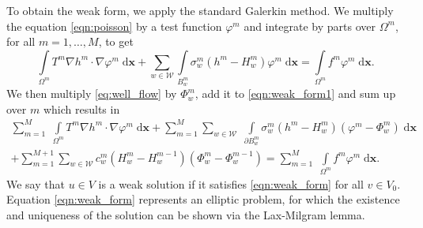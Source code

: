 \documentclass{elsarticle}
\def\vc#1{\mathbf{\boldsymbol{#1}}}     %
\def\avg#1{\langle#1\rangle}
\newcommand{\dd}{\; \mathrm{d}}
\newcommand{\bx}{\vc{x}}
\newcommand{\noteJB}[1]{{\color{Blue} \textbf{JB: } \textit{#1}}}
\begin{document}
To obtain the weak form, we apply the standard Galerkin method. We multiply the equation \eqref{eqn:poisson} 
by a test function $\varphi^m$ and integrate by parts over $\Omega^m$, for all $m=1,\ldots,M$, to get
\begin{equation} \label{eqn:weak_form1}
  \int \limits_{\Omega^m} T^m \nabla h^m \cdot \nabla \varphi^m \dd\bx
  + \sum \limits_{w\in \mathcal{W}} \int \limits_{B^m_w} \sigma^m_w (h^m - H_w^m) \varphi^m \dd\bx
  = \int \limits_{\Omega^m} f^m\varphi^m \dd\bx.
\end{equation}
We then multiply \eqref{eq:well_flow} by $\Phi^m_w$, add it to \eqref{eqn:weak_form1} 
and sum up over $m$ which results in
\begin{multline} \label{eqn:weak_form}
  \sum \limits_{m=1}^M \; \int \limits_{\Omega^m} T^m \nabla h^m \cdot \nabla \varphi^m \dd\bx
        + \sum \limits_{m=1}^M \sum \limits_{w\in \mathcal{W}} \; 
           \int \limits_{\partial B^m_w} \sigma^m_w\left(h^m-H^m_w\right)\left(\varphi^m-\Phi^m_w\right) \dd\bx \\
        + \sum \limits_{m=1}^{M+1} \sum\limits_{w\in\mathcal{W}}
          c_w^{m}\left( H^{m}_w-H_w^{m-1}\right)\left(\Phi^{m}_w - \Phi^{m-1}_w\right)           
  = \sum \limits_{m=1}^M \; \int \limits_{\Omega^m} f^m\varphi^m \dd\bx.   
\end{multline}
We say that $u\in V$ is a weak solution if it satisfies \eqref{eqn:weak_form} for all $v\in V_0$. Equation \eqref{eqn:weak_form} represents an elliptic
problem, for which the existence and uniqueness of the solution can be shown via the Lax-Milgram lemma.
\end{document}
